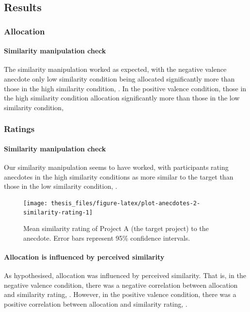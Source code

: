 \documentclass[a4paper, nobind, dvipsnames]{templates/ociamthesis}
\theoremstyle{definition}
\theoremstyle{definition}
\theoremstyle{definition}
\theoremstyle{definition}
\theoremstyle{remark}
\begin{document}
\hypertarget{results-anecdotes-2-appendix}{%
\subsection{Results}\label{results-anecdotes-2-appendix}}

\subsubsection{Allocation}

\paragraph{Similarity manipulation check}

The similarity manipulation worked as expected, with the negative valence
anecdote only low similarity condition being allocated significantly more than
those in the high similarity condition,
. In the
positive valence condition, those in the high similarity condition allocation
significantly more than those in the low similarity condition,

\subsubsection{Ratings}

\paragraph{Similarity manipulation check}

Our similarity manipulation seems to have worked, with participants rating
anecdotes in the high similarity conditions as more similar to the target than
those in the low similarity condition,
.



\begin{figure}
\texttt{[image: thesis\_files/figure-latex/plot-anecdotes-2-similarity-rating-1]} \caption{Mean similarity rating of Project A (the target project) to the anecdote. Error bars represent 95\% confidence intervals.}\label{fig:plot-anecdotes-2-similarity-rating}
\end{figure}

\paragraph{Allocation is influenced by perceived similarity}

As hypothesised, allocation was influenced by perceived similarity. That is, in
the negative valence condition, there was a negative correlation between
allocation and similarity rating,
.
However, in the positive valence condition,
there was a positive correlation between allocation and similarity rating,
.
\end{document}
